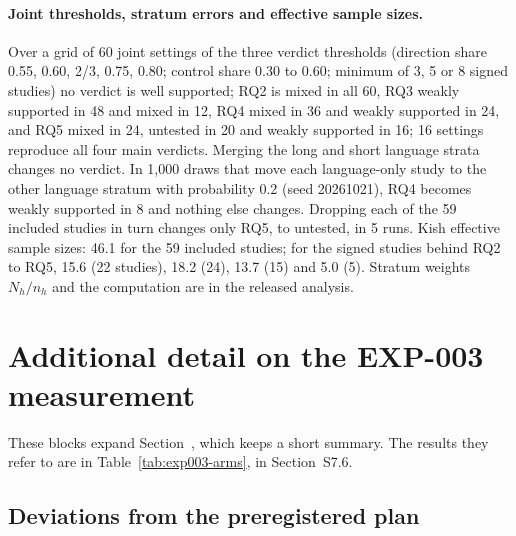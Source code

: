 \documentclass[acmsmall,screen]{acmart}
\makeatletter
\newcommand{\Mref}[1]{\@ifundefined{mr@#1}{\textbf{??}}{\csname mr@#1\endcsname}}
\makeatother
\begin{document}
{\scriptsize



\paragraph{Joint thresholds, stratum errors and effective sample sizes.} Over a grid of 60 joint settings of the three verdict thresholds (direction share 0.55, 0.60, 2/3, 0.75, 0.80; control share 0.30 to 0.60; minimum of 3, 5 or 8 signed studies) no verdict is well supported; RQ2 is mixed in all 60, RQ3 weakly supported in 48 and mixed in 12, RQ4 mixed in 36 and weakly supported in 24, and RQ5 mixed in 24, untested in 20 and weakly supported in 16; 16 settings reproduce all four main verdicts. Merging the long and short language strata changes no verdict. In 1,000 draws that move each language-only study to the other language stratum with probability 0.2 (seed 20261021), RQ4 becomes weakly supported in 8 and nothing else changes. Dropping each of the 59 included studies in turn changes only RQ5, to untested, in 5 runs. Kish effective sample sizes: 46.1 for the 59 included studies; for the signed studies behind RQ2 to RQ5, 15.6 (22 studies), 18.2 (24), 13.7 (15) and 5.0 (5). Stratum weights $N_h/n_h$ and the computation are in the released analysis.
}

\setcounter{section}{6}
\section{Additional detail on the EXP-003 measurement}
\label{sec:s-exp003}

These blocks expand Section~\Mref{sec:exp003}, which keeps a short summary. The results they refer to are in Table~\ref{tab:exp003-arms}, in Section~S7.6.

\subsection{Deviations from the preregistered plan}
\label{sec:s-exp003-dev}
\end{document}
